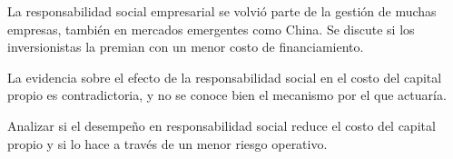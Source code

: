 \documentclass{article}
\newcommand{\bodysize}{\fontsize{30}{39.6}\selectfont}
\newcommand{\cardtitlesize}{\fontsize{35.4}{42.5}\selectfont}
\newcommand{\smallsize}{\fontsize{24.6}{32.0}\selectfont}
\newcommand{\cardtitle}[2][navy]{{\color{#1}\cardtitlesize\bfseries\textls[110]{\MakeUppercase{#2}}}\par\vspace{7mm}}
\begin{document}
\vfill
\hspace*{34mm}\begin{minipage}{773mm}
\begin{tcolorbox}[enhanced, sharp corners, colback=navy, boxrule=0pt, left=16mm, right=16mm, top=12mm, bottom=11mm,
  fontupper=\bodysize\raggedright, overlay={\fill[gold] (frame.north west) rectangle ([yshift=-5mm]frame.north east);}]
\begin{minipage}[t]{174.8mm}\raggedright{\color{acento}\smallsize\bfseries{}}\par{}\end{minipage}\hfill\begin{minipage}[t]{174.8mm}\raggedright{\color{acento}\smallsize\bfseries{}}\par{}\end{minipage}\hfill\begin{minipage}[t]{174.8mm}\raggedright{\color{acento}\smallsize\bfseries{}}\par{}\end{minipage}\hfill\begin{minipage}[t]{174.8mm}\raggedright{\color{acento}\smallsize\bfseries{}}\par{}\end{minipage}
\end{tcolorbox}
\end{minipage}

\vfill
\hspace*{34mm}\begin{minipage}{773mm}
\begin{tcbraster}[raster columns=3, raster equal height, raster column skip=16mm]
\begin{tcolorbox}[card]\cardtitle{Contexto}La responsabilidad social empresarial se volvió parte de la gestión de muchas empresas, también en mercados emergentes como China. Se discute si los inversionistas la premian con un menor costo de financiamiento.\end{tcolorbox}
\begin{tcolorbox}[card]\cardtitle{Problema}La evidencia sobre el efecto de la responsabilidad social en el costo del capital propio es contradictoria, y no se conoce bien el mecanismo por el que actuaría.\end{tcolorbox}
\begin{tcolorbox}[card]\cardtitle{Objetivo}Analizar si el desempeño en responsabilidad social reduce el costo del capital propio y si lo hace a través de un menor riesgo operativo.\end{tcolorbox}
\end{tcbraster}
\end{minipage}
\end{document}
